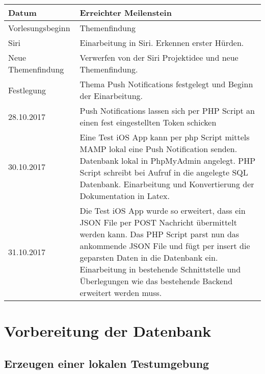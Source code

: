 \noindent%
\begin{tabularx}{\textwidth}{|p{}|X| }
\hline
\textbf{Datum} & \textbf{Erreichter Meilenstein}  \\ \hline 

Vorlesungsbeginn & Themenfindung \\ \hline

Siri & Einarbeitung in Siri. Erkennen erster Hürden. \\ \hline

Neue Themenfindung & Verwerfen von der Siri Projektidee und neue Themenfindung. \\ \hline

Festlegung & Thema Push Notifications festgelegt und Beginn der Einarbeitung. \\ \hline

28.10.2017 & Push Notifications lassen sich per PHP Script an einen fest eingestellten Token schicken \\ \hline

30.10.2017 & Eine Test iOS App kann per php Script mittels MAMP lokal eine Push Notification senden. \newline
Datenbank lokal in PhpMyAdmin angelegt. \newline
PHP Script schreibt bei Aufruf in die angelegte SQL Datenbank. \newline
Einarbeitung und Konvertierung der Dokumentation in Latex.
 \\ \hline
 31.10.2017 & Die Test iOS App wurde so erweitert, dass ein JSON File per POST Nachricht übermittelt werden kann.\newline
Das PHP Script parst nun das ankommende JSON File und fügt per insert die geparsten Daten in die Datenbank ein.\newline 
Einarbeitung in bestehende Schnittstelle und Überlegungen wie das bestehende Backend erweitert werden muss. 
 \\ \hline
 
 

\end{tabularx}

\newpage


\section{Vorbereitung der Datenbank}

\subsection{Erzeugen einer lokalen Testumgebung}

